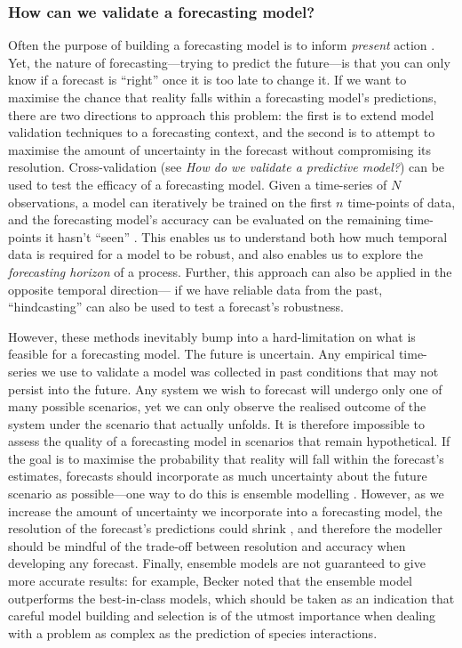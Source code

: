 \subsubsection{How can we validate a forecasting
model?}\label{how-can-we-validate-a-forecasting-model}

Often the purpose of building a forecasting model is to inform
\emph{present} action \cite{Dietze2018IteNea}. Yet, the nature of
forecasting---trying to predict the future---is that you can only know
if a forecast is ``right'' once it is too late to change it. If we want
to maximise the chance that reality falls within a forecasting model's
predictions, there are two directions to approach this problem: the
first is to extend model validation techniques to a forecasting context,
and the second is to attempt to maximise the amount of uncertainty in
the forecast without compromising its resolution. Cross-validation (see
\emph{How do we validate a predictive model?}) can be used to test the
efficacy of a forecasting model. Given a time-series of \(N\)
observations, a model can iteratively be trained on the first \(n\)
time-points of data, and the forecasting model's accuracy can be
evaluated on the remaining time-points it hasn't ``seen''
\cite{Bishop2006PatRec}. This enables us to understand both how much
temporal data is required for a model to be robust, and also enables us
to explore the \emph{forecasting horizon} of a process. Further, this
approach can also be applied in the opposite temporal direction--- if we
have reliable data from the past, ``hindcasting'' can also be used to
test a forecast's robustness.

However, these methods inevitably bump into a hard-limitation on what is
feasible for a forecasting model. The future is uncertain. Any empirical
time-series we use to validate a model was collected in past conditions
that may not persist into the future. Any system we wish to forecast
will undergo only one of many possible scenarios, yet we can only
observe the realised outcome of the system under the scenario that
actually unfolds. It is therefore impossible to assess the quality of a
forecasting model in scenarios that remain hypothetical. If the goal is
to maximise the probability that reality will fall within the forecast's
estimates, forecasts should incorporate as much uncertainty about the
future scenario as possible---one way to do this is ensemble modelling
\cite{Parker2013EnsMod}. However, as we increase the amount of
uncertainty we incorporate into a forecasting model, the resolution of
the forecast's predictions could shrink \cite{Lei2017EvaTra}, and
therefore the modeller should be mindful of the trade-off between
resolution and accuracy when developing any forecast. Finally, ensemble
models are not guaranteed to give more accurate results: for example,
Becker \cite{Becker2020PreWil} noted that the ensemble model outperforms the
best-in-class models, which should be taken as an indication that
careful model building and selection is of the utmost importance when
dealing with a problem as complex as the prediction of species
interactions.


